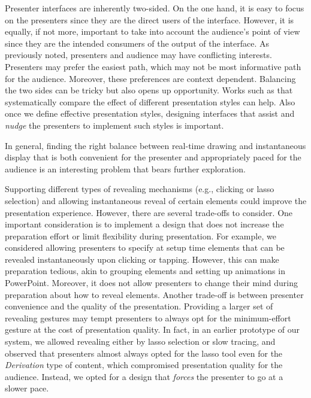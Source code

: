 Presenter interfaces are inherently two-sided. On the one hand, it is easy to focus on the presenters since they are the direct users of the interface. However, it is equally, if not more, important to take into account the audience's point of view since they are the intended consumers of the output of the interface. As previously noted, presenters and audience may have conflicting interests. Presenters may prefer the easiest path, which may not be most informative path for the audience. Moreover, these preferences are context dependent.  Balancing the two sides can be tricky but also opens up opportunity. Works such as \cite{seth2010powerpoint, cross2013typerighting} that systematically compare the effect of different presentation styles can help. Also once we define effective presentation styles, designing interfaces that assist and \textit{nudge} the presenters to implement such styles is important. 

In general, finding the right balance between real-time drawing and instantaneous display that is both convenient for the presenter and appropriately paced for the audience is an interesting problem that bears further exploration.

Supporting different types of revealing mechanisms (e.g., clicking or lasso selection) and allowing instantaneous reveal of certain elements could improve the presentation experience. However, there are several trade-offs to consider.
%
One important consideration is to implement a design that does not increase the preparation effort or limit flexibility during presentation. For example, we considered allowing presenters to specify at setup time elements that can be revealed instantaneously upon clicking or tapping. However, this can make preparation tedious, akin to grouping elements and setting up animations in PowerPoint. Moreover, it does not allow presenters to change their mind during preparation about how to reveal elements. 
%
Another trade-off is between presenter convenience and the quality of the presentation. Providing a larger set of revealing gestures may tempt presenters to always opt for the minimum-effort gesture at the cost of presentation quality. In fact, in an earlier prototype of our system, we allowed revealing either by lasso selection or slow tracing, and observed that presenters almost always opted for the lasso tool even for the \textit{Derivation} type of content, which compromised presentation quality for the audience. Instead, we opted for a design that \textit{forces} the presenter to go at a slower pace.
\fi


